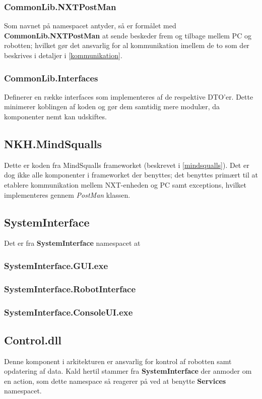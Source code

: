 \subsubsection{CommonLib.NXTPostMan}
Som navnet på namespacet antyder, så er formålet med \textbf{CommonLib.NXTPostMan} at sende beskeder frem og tilbage mellem PC og robotten; hvilket gør det ansvarlig for al kommunikation imellem de to som der beskrives i detaljer i \cref{kommunikation}.

\subsubsection{CommonLib.Interfaces}
Definerer en række interfaces som implementeres af de respektive DTO'er.
Dette minimerer koblingen af koden og gør dem samtidig mere modulær, da komponenter nemt kan udskiftes.

\subsection{NKH.MindSqualls}\label{arkitektur:mindsqualls}
Dette er koden fra MindSqualls frameworket (beskrevet i \cref{mindsqualls}).
Det er dog ikke alle komponenter i frameworket der benyttes; det benyttes primært til at etablere kommunikation mellem NXT-enheden og PC samt exceptions, hvilket implementeres gennem \textit{PostMan} klassen.

\subsection{SystemInterface}\label{arkitektur:systeminterface}
Det er fra \textbf{SystemInterface} namespacet at 

\subsubsection{SystemInterface.GUI.exe}

\subsubsection{SystemInterface.RobotInterface}

\subsubsection{SystemInterface.ConsoleUI.exe}

\subsection{Control.dll}\label{arkitektur:control}
Denne komponent i arkitekturen er ansvarlig for kontrol af robotten samt opdatering af data.
Kald hertil stammer fra \textbf{SystemInterface} der anmoder om en action, som dette namespace så reagerer på ved at benytte \textbf{Services} namespacet.

